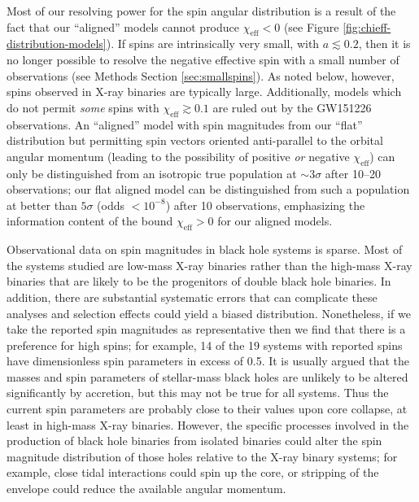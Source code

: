 \documentclass{nature-arxiv}
\newcommand{\chieff}{\chi_\mathrm{eff}}
\begin{document}
Most of our resolving power for the spin angular distribution is a
result of the fact that our ``aligned'' models cannot produce
$\chieff < 0$ (see Figure \ref{fig:chieff-distribution-models}).  If
spins are intrinsically very small, with $a \lesssim 0.2$, then it is
no longer possible to resolve the negative effective spin with a small
number of observations (see Methods Section \ref{sec:smallspins}).  As
noted below, however, spins observed in X-ray binaries are typically
large.  Additionally, models which do not permit \emph{some} spins
with $\chieff \gtrsim 0.1$ are ruled out by the GW151226
observations\cite{2016PhRvL.116x1103A}.  An ``aligned'' model with
spin magnitudes from our ``flat'' distribution but permitting spin
vectors oriented anti-parallel to the orbital angular momentum
(leading to the possibility of positive \emph{or} negative $\chieff$)
can only be distinguished from an isotropic true population at
$\sim 3 \sigma$ after 10--20 observations\cite{2017CQGra..34cLT01V};
our flat aligned model can be distinguished from such a population at
better than $5\sigma$ (odds $< 10^{-8}$) after 10 observations,
emphasizing the information content of the bound $\chieff > 0$ for our
aligned models.

Observational data on spin magnitudes in black hole systems is
sparse\cite{2015PhR...548....1M}.  Most of the systems studied are
low-mass X-ray binaries rather than the high-mass X-ray binaries that
are likely to be the progenitors of double black hole binaries.  In
addition, there are substantial systematic errors that can complicate
these analyses\cite{2015PhR...548....1M} and selection effects could
yield a biased distribution. Nonetheless, if we take the reported spin
magnitudes as representative then we find that there is a preference
for high spins; for example, 14 of the 19 systems with reported spins
have dimensionless spin parameters in excess of 0.5.  It is usually
argued that the masses and spin parameters of stellar-mass black holes
are unlikely to be altered significantly by
accretion\cite{1999MNRAS.305..654K}, but this may not be true for all
systems\cite{2015ApJ...800...17F}.  Thus the current spin parameters
are probably close to their values upon core collapse, at least in
high-mass X-ray binaries.  However, the specific processes involved in
the production of black hole binaries from isolated binaries could
alter the spin magnitude distribution of those holes relative to the
X-ray binary systems; for example, close tidal interactions could spin
up the core, or stripping of the envelope could reduce the available
angular
momentum\cite{2016MNRAS.462..844K,2017arXiv170200885Z,2017arXiv170203952H}.
\end{document}
